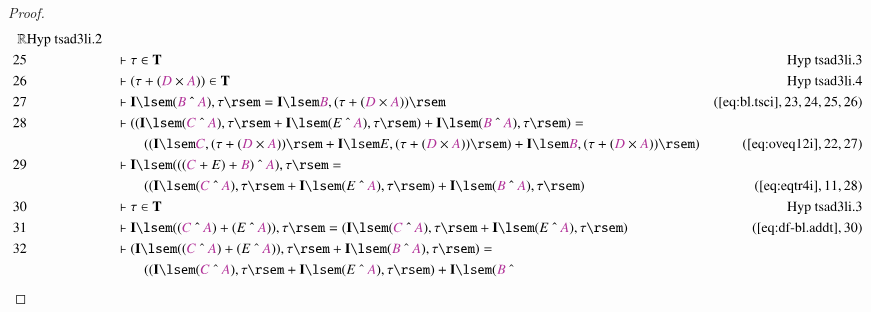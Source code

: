 \begin{proof}
\begin{align}
      \mathbb{R}&\text{Hyp~tsad3li.2}\notag%
  \\ 25 &&  & \vdash \tau \in
      \mathbf{T}&\text{Hyp~tsad3li.3}\notag%
  \\ 26 &&  & \vdash ( \tau + ( \mc{D} \times \mc{A} ) ) \in
      \mathbf{T}&\text{Hyp~tsad3li.4}\notag%
  \\ 27 &&  & \vdash \mathbf{I} \lsem ( \mc{B} ~\string^~ \mc{A} ) , \tau \rsem
      = \mathbf{I} \lsem \mc{B} , ( \tau + ( \mc{D} \times
      \mc{A} ) )
      \rsem&(\mbox{\ref{eq:bl.tsci}},23,24,25,26)\notag
  \\ 28 &&  & \vdash ( ( \mathbf{I} \lsem ( \mc{C} ~\string^~ \mc{A} ) , \tau
      \rsem + \mathbf{I} \lsem ( E ~\string^~ \mc{A} ) ,
      \tau \rsem ) + \mathbf{I} \lsem ( \mc{B} ~\string^~
      \mc{A} ) , \tau \rsem ) =  \notag \\ & & & \qquad
     ( ( \mathbf{I} \lsem \mc{C}
      , ( \tau + ( \mc{D} \times \mc{A} ) ) \rsem +
      \mathbf{I} \lsem E , ( \tau + ( \mc{D} \times \mc{A} )
      ) \rsem ) + \mathbf{I} \lsem \mc{B} , ( \tau + (
      \mc{D} \times \mc{A} ) ) \rsem
      )&(\mbox{\ref{eq:oveq12i}},22,27)\notag
  \\ 29 &&  & \vdash \mathbf{I} \lsem ( ( ( \mc{C} + E ) + \mc{B} ) ~\string^~
      \mc{A} ) , \tau \rsem =  \notag \\ & & & \qquad
     ( ( \mathbf{I} \lsem ( \mc{C}
      ~\string^~ \mc{A} ) , \tau \rsem + \mathbf{I} \lsem (
      E ~\string^~ \mc{A} ) , \tau \rsem ) + \mathbf{I}
      \lsem ( \mc{B} ~\string^~ \mc{A} ) , \tau \rsem
      )&(\mbox{\ref{eq:eqtr4i}},11,28)\notag
  \\ 30 &&  & \vdash \tau \in
      \mathbf{T}&\text{Hyp~tsad3li.3}\notag%
  \\ 31 &&  & \vdash \mathbf{I} \lsem ( ( \mc{C} ~\string^~ \mc{A} ) + ( E
      ~\string^~ \mc{A} ) ) , \tau \rsem = ( \mathbf{I}
      \lsem ( \mc{C} ~\string^~ \mc{A} ) , \tau \rsem +
      \mathbf{I} \lsem ( E ~\string^~ \mc{A} ) , \tau \rsem
      )&(\mbox{\ref{eq:df-bl.addt}},30)\notag
  \\ 32 &&  & \vdash ( \mathbf{I} \lsem ( ( \mc{C} ~\string^~ \mc{A} ) + ( E
      ~\string^~ \mc{A} ) ) , \tau \rsem + \mathbf{I} \lsem
      ( \mc{B} ~\string^~ \mc{A} ) , \tau \rsem ) =  \notag \\ & & & \qquad
     ( (
      \mathbf{I} \lsem ( \mc{C} ~\string^~ \mc{A} ) , \tau
      \rsem + \mathbf{I} \lsem ( E ~\string^~ \mc{A} ) ,
      \tau \rsem ) + \mathbf{I} \lsem ( \mc{B} ~\string^~

\end{align}
\end{proof}
